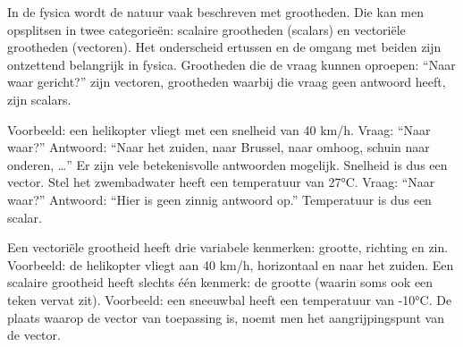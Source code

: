 \documentclass{ximera}
\begin{document}
	\author{Bart Lambregs}
    \xmsource\xmuitleg


	In de fysica wordt de natuur vaak beschreven met grootheden. Die kan men opsplitsen in twee categorieën: scalaire grootheden (scalars) en vectoriële grootheden (vectoren). 
	Het onderscheid ertussen en de omgang met beiden zijn ontzettend belangrijk in fysica.
	Grootheden die de vraag kunnen oproepen: “Naar waar gericht?” zijn vectoren, grootheden waarbij die vraag geen antwoord heeft, zijn scalars. 

	Voorbeeld: een helikopter vliegt met een snelheid van 40 km/h. 
	Vraag: “Naar waar?” Antwoord: “Naar het zuiden, naar Brussel, naar omhoog, schuin naar onderen, …” 
	Er zijn vele betekenisvolle antwoorden mogelijk. 
	Snelheid is dus een vector. 
	Stel het zwembadwater heeft een temperatuur van 27°C. 
	Vraag: “Naar waar?” Antwoord: “Hier is geen zinnig antwoord op.” 
	Temperatuur is dus een scalar.

	Een vectoriële grootheid heeft drie variabele kenmerken: grootte, richting en zin. 
	Voorbeeld: de helikopter vliegt aan 40 km/h, horizontaal en naar het zuiden. 
	Een scalaire grootheid heeft slechts één kenmerk: de grootte (waarin soms ook een teken vervat zit). 
	Voorbeeld: een sneeuwbal heeft een temperatuur van -10°C.
	De plaats waarop de vector van toepassing is, noemt men het aangrijpingspunt van de vector.
	

	
\end{document}
